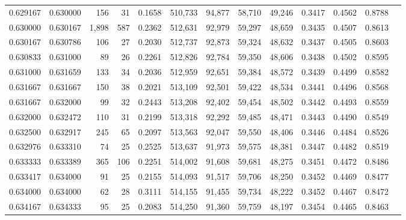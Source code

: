 \begin{tabular}{rrrrrrrrrrrrr}
0.629167 & 0.630000 &   156 &  31 &                                     0.1658 & 510,733 &  94,877 &  58,710 &  49,246 & 0.3417 & 0.4562 & 0.8788 \\
0.630000 & 0.630167 & 1,898 & 587 &                                     0.2362 & 512,631 &  92,979 &  59,297 &  48,659 & 0.3435 & 0.4507 & 0.8613 \\
0.630167 & 0.630786 &   106 &  27 &                                     0.2030 & 512,737 &  92,873 &  59,324 &  48,632 & 0.3437 & 0.4505 & 0.8603 \\
0.630833 & 0.631000 &    89 &  26 &                                     0.2261 & 512,826 &  92,784 &  59,350 &  48,606 & 0.3438 & 0.4502 & 0.8595 \\
0.631000 & 0.631659 &   133 &  34 &                                     0.2036 & 512,959 &  92,651 &  59,384 &  48,572 & 0.3439 & 0.4499 & 0.8582 \\
0.631667 & 0.631667 &   150 &  38 &                                     0.2021 & 513,109 &  92,501 &  59,422 &  48,534 & 0.3441 & 0.4496 & 0.8568 \\
0.631667 & 0.632000 &    99 &  32 &                                     0.2443 & 513,208 &  92,402 &  59,454 &  48,502 & 0.3442 & 0.4493 & 0.8559 \\
0.632000 & 0.632472 &   110 &  31 &                                     0.2199 & 513,318 &  92,292 &  59,485 &  48,471 & 0.3443 & 0.4490 & 0.8549 \\
0.632500 & 0.632917 &   245 &  65 &                                     0.2097 & 513,563 &  92,047 &  59,550 &  48,406 & 0.3446 & 0.4484 & 0.8526 \\
0.632976 & 0.633310 &    74 &  25 &                                     0.2525 & 513,637 &  91,973 &  59,575 &  48,381 & 0.3447 & 0.4482 & 0.8519 \\
0.633333 & 0.633389 &   365 & 106 &                                     0.2251 & 514,002 &  91,608 &  59,681 &  48,275 & 0.3451 & 0.4472 & 0.8486 \\
0.633417 & 0.634000 &    91 &  25 &                                     0.2155 & 514,093 &  91,517 &  59,706 &  48,250 & 0.3452 & 0.4469 & 0.8477 \\
0.634000 & 0.634000 &    62 &  28 &                                     0.3111 & 514,155 &  91,455 &  59,734 &  48,222 & 0.3452 & 0.4467 & 0.8472 \\
0.634167 & 0.634333 &    95 &  25 &                                     0.2083 & 514,250 &  91,360 &  59,759 &  48,197 & 0.3454 & 0.4465 & 0.8463 \\

\end{tabular}

